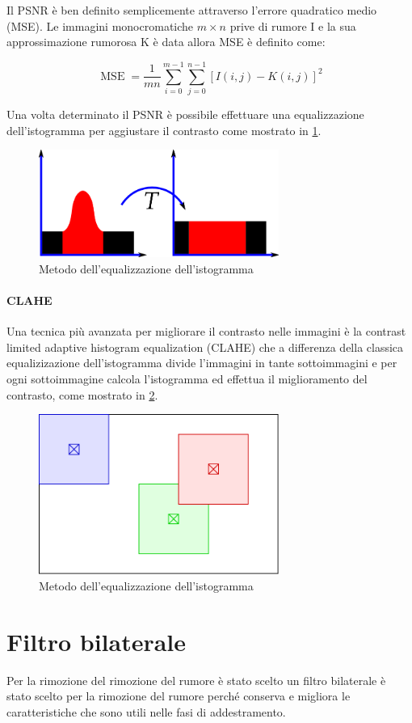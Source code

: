 Il PSNR è ben definito semplicemente attraverso l'errore quadratico medio (MSE).
Le immagini monocromatiche \(m\times n\) prive di rumore I e la sua approssimazione rumorosa K è data allora MSE è definito come:

\[ \operatorname{MSE}=\frac{1}{m n} \sum_{i=0}^{m-1} \sum_{j=0}^{n-1}[I(i, j)-K(i, j)]^{2} \]

Una volta determinato il PSNR è possibile effettuare una equalizzazione dell'istogramma per aggiustare il contrasto come mostrato in \cref{fig:histogram}\cite{pandey_contrast}\cite{permual_contrast}\cite{hummel_histogram}.

\begin{figure}[ht]
    \centering
    \includegraphics[width=0.7\textwidth]{preprocessing/histogram.png}
    \caption{Metodo dell'equalizzazione dell'istogramma}
    \label{fig:histogram}
\end{figure}

\paragraph{CLAHE}\label{clahe}

Una tecnica più avanzata per migliorare il contrasto nelle immagini è la contrast limited adaptive histogram equalization (CLAHE) che a differenza della classica equalizizazione dell'istogramma divide l'immagini in tante sottoimmagini e per ogni sottoimmagine calcola l'istogramma ed effettua il miglioramento del contrasto, come mostrato in \cref{fig:clahe}\cite{hummel_histogram}.


\begin{figure}[ht]
    \centering
    \includegraphics[width=0.7\textwidth]{preprocessing/clahe.pdf}
    \caption{Metodo dell'equalizzazione dell'istogramma}
    \label{fig:clahe}
\end{figure}

\section{Filtro bilaterale}\label{filtro-bilaterale}

Per la rimozione del rimozione del rumore  è stato scelto un  filtro bilaterale è stato scelto per la rimozione del rumore perché conserva
e migliora le caratteristiche che sono utili nelle fasi di addestramento\cite{narbalata_larynge}.